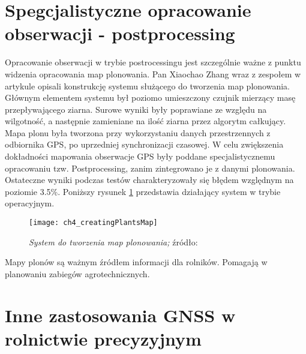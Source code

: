 \section{Spegcjalistyczne opracowanie obserwacji - postprocessing}
Opracowanie obserwacji w trybie postrocessingu jest szczególnie ważne z punktu widzenia opracowania map plonowania.
Pan Xiaochao Zhang wraz z zespołem w artykule \cite{CCTA_951_958} opisali konstrukcję systemu służącego do tworzenia map plonowania.
Głównym elementem systemu był poziomo umieszczony czujnik mierzący masę przepływającego ziarna.
Surowe wyniki były poprawiane ze względu na wilgotność, a następnie zamieniane na ilość ziarna przez algorytm całkujący.
Mapa plonu była tworzona przy wykorzystaniu danych przestrzennych z odbiornika GPS, po uprzedniej synchronizacji czasowej.
W celu zwiększenia dokładności mapowania obserwacje GPS były poddane specjalistycznemu opracowaniu tzw. Postprocessing,
zanim zintegrowano je z danymi plonowania. Ostateczne wyniki podczas testów charakteryzowały się błędem względnym na poziomie 3.5\%. 
Poniższy rysunek \ref{fig:ch4_creatingPlantsMap} przedstawia działający system w trybie operacyjnym.
\begin{figure}[H]
\centering
\texttt{[image: ch4\_creatingPlantsMap]}
\caption{\textit{System do tworzenia map plonowania;} źródło: \cite[][strona 954]{CCTA_951_958}}
\label{fig:ch4_creatingPlantsMap}
\end{figure}
Mapy plonów są ważnym źródłem informacji dla rolników. Pomagają w planowaniu zabiegów agrotechnicznych.

\section{Inne zastosowania GNSS w rolnictwie precyzyjnym}

